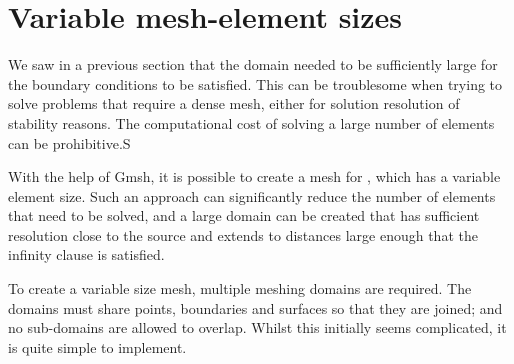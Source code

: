 % 
% 

\section{Variable mesh-element sizes}
We saw in a previous section that the domain needed to be sufficiently
large for the boundary conditions to be satisfied. This can be troublesome when
trying to solve problems that require a dense mesh, either for solution
resolution of stability reasons. The computational cost of solving a large
number of elements can be prohibitive.S

With the help of Gmsh, it is possible to create a mesh for \esc, which has a
variable element size. Such an approach can significantly reduce the number of
elements that need to be solved, and a large domain can be created that has
sufficient resolution close to the source and extends to distances large enough
that the infinity clause is satisfied.

To create a variable size mesh, multiple meshing domains are required. The
domains must share points, boundaries and surfaces so that they are joined; and
no sub-domains are allowed to overlap. Whilst this initially seems complicated,
it is quite simple to implement. 

